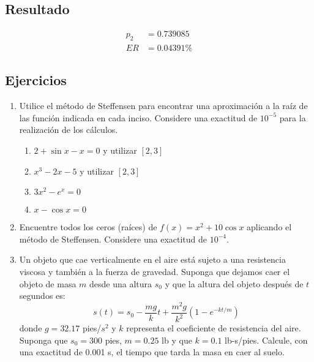 \begin{exerciseT}
\subsection*{Resultado}
\begin{align*}
	p_2 &= 0.739085 \\
	ER &= 0.04391 \%
\end{align*}
\end{exerciseT}

\subsection*{Ejercicios}
\begin{enumerate}
  \item Utilice el método de Steffensen para encontrar una aproximación a la raíz de las función indicada en 
  cada inciso. Considere una exactitud de $10^{-5}$ para la realización de los cálculos.
  \begin{enumerate}
    \item $2 + \sin x - x = 0$ y utilizar $[2,3]$
    \item $x^3-2x-5$ y utilizar $[2,3]$
    \item $3x^2-e^x=0$
    \item $x - \cos x = 0$
  \end{enumerate}
  
  \item Encuentre todos los ceros (raíces) de $f(x)=x^2+10\cos x$ aplicando el método de Steffensen. 
  Considere una exactitud de $10^{-4}$.
  
  \item Un objeto que cae verticalmente en el aire está sujeto a una resistencia viscosa y también a la fuerza 
  de gravedad. Suponga que dejamos caer el objeto de masa $m$ desde una altura $s_{0}$ y que la altura del objeto 
  después de $t$ segundos es:
  $$s(t) = s_{0} - \dfrac{mg}{k}t + \dfrac{m^2g}{k^2}(1-e^{-kt/m})$$
  donde $g=32.17$ pies/$s^2$ y $k$ representa el coeficiente de resistencia del aire. Suponga que $s_{0} = 300$ 
  pies, $m=0.25$ lb y que $k=0.1$ lb-s/pies. Calcule, con una exactitud de 0.001 s, el tiempo que tarda la masa 
  en caer al suelo.
\end{enumerate}

